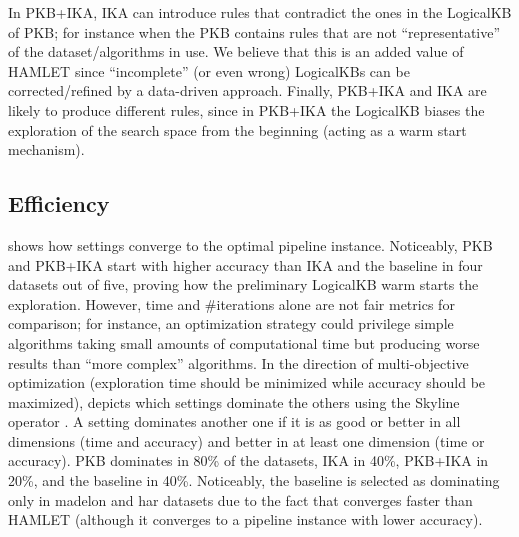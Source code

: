 In PKB+IKA, IKA can introduce rules that contradict the ones in the LogicalKB of PKB; for instance when the PKB contains rules that are not ``representative'' of the dataset/algorithms in use. We believe that this is an added value of HAMLET since ``incomplete'' (or even wrong) LogicalKBs can be corrected/refined by a data-driven approach. Finally, PKB+IKA and IKA are likely to produce different rules, since in PKB+IKA the LogicalKB biases the exploration of the search space from the beginning (acting as a warm start mechanism).

\subsection{Efficiency}


 shows how settings converge to the optimal pipeline instance.
Noticeably, PKB and PKB+IKA start with higher accuracy than IKA and the baseline in four datasets out of five, proving how the preliminary LogicalKB warm starts the exploration.
However, time and \#iterations alone are not fair metrics for comparison; for instance, an optimization strategy could privilege simple algorithms taking small amounts of computational time but producing worse results than ``more complex'' algorithms.
In the direction of multi-objective optimization (exploration time should be minimized while accuracy should be maximized),  depicts which settings dominate the others using the Skyline operator \cite{borzsony2001skyline}.
A setting dominates another one if it is as good or better in all dimensions (time and accuracy) and better in at least one dimension (time or accuracy).
PKB dominates in 80\% of the datasets, IKA in 40\%, PKB+IKA in 20\%, and the baseline in 40\%.
Noticeably, the baseline is selected as dominating only in madelon and har datasets due to the fact that converges faster than HAMLET (although it converges to a pipeline instance with lower accuracy).



